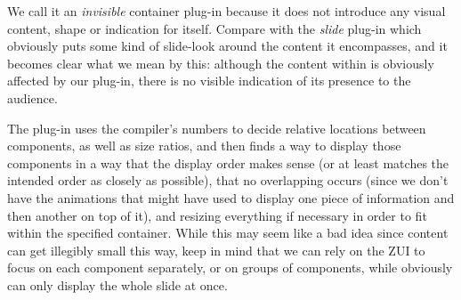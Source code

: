    We call it an \emph{invisible} container plug-in because it does not
   introduce any visual content, shape or indication for itself. Compare with
   the \emph{slide} plug-in which obviously puts some kind of slide-look around
   the content it encompasses, and it becomes clear what we mean by this:
   although the content within is obviously affected by our plug-in, there is
   no visible indication of its presence to the audience.

   The plug-in uses the compiler's numbers to decide relative locations between
   components, as well as size ratios, and then finds a way to display those
   components in a way that the display order makes sense (or at least matches
   the intended order as closely as possible), that no overlapping occurs
   (since we don't have the animations that \ppt might have used to display one
   piece of information and then another on top of it), and resizing everything
   if necessary in order to fit within the specified container. While this may
   seem like a bad idea since content can get illegibly small this way, keep in
   mind that we can rely on the ZUI to focus on each component separately, or
   on groups of components, while \ppt obviously can only display the whole
   slide at once.


